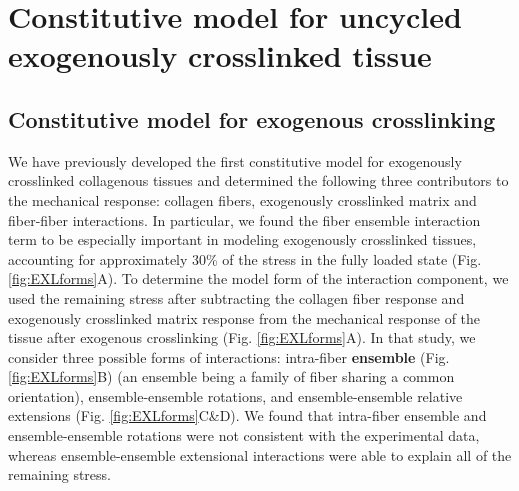 \section{Constitutive model for uncycled exogenously crosslinked tissue}
\subsection{Constitutive model for exogenous crosslinking}

	We have previously developed the first constitutive model for exogenously crosslinked collagenous tissues \cite{sacks_novel_2016} and determined the following three contributors to the mechanical response: collagen fibers, exogenously crosslinked matrix and fiber-fiber interactions. 
	In particular, we found the fiber ensemble interaction term to be especially important in modeling exogenously crosslinked tissues, accounting for approximately 30\% of the stress in the fully loaded state (Fig. \ref{fig:EXLforms}A). 
	To determine the model form of the interaction component, we used the remaining stress after subtracting the collagen fiber response and exogenously crosslinked matrix response from the mechanical response of the tissue after exogenous crosslinking (Fig. \ref{fig:EXLforms}A). 
	In that study, we consider three possible forms of interactions: intra-fiber \textbf{ensemble} (Fig. \ref{fig:EXLforms}B) (an ensemble being a family of fiber sharing a common orientation), ensemble-ensemble rotations, and ensemble-ensemble relative extensions (Fig. \ref{fig:EXLforms}C\&D). 
	We found that intra-fiber ensemble and ensemble-ensemble rotations were not consistent with the experimental data, whereas ensemble-ensemble extensional interactions were able to explain all of the remaining stress. 
	

